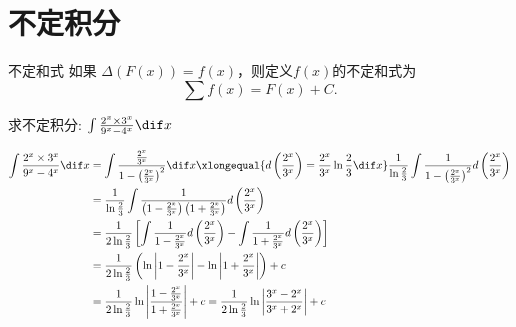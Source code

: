 \documentclass[color=green,titlestyle=hang]{elegantbook}%
\begin{document}
\section{不定积分}

\begin{definition}{不定和式}{}
如果 $\Delta(F(x))=f(x)$，则定义$f(x)$的{\color{blue}不定和式}为
\[ \sum f(x) = F(x) + C. \]
\end{definition}

\begin{exercise}
求不定积分: $\int {\frac{{{2^x} \times {3^x}}}{{{9^x} - {4^x}}}} \dif x$	
\end{exercise}\begin{solution}
\begin{align*}
\int {\frac{{{2^x} \times {3^x}}}{{{9^x} - {4^x}}}} \dif x&= \int {\frac{{\frac{{{2^x}}}{{{3^x}}}}}{{1 - {{\left( {\frac{{{2^x}}}{{{3^x}}}} \right)}^2}}}} \dif x\xlongequal{{d\left( {\frac{{{2^x}}}{{{3^x}}}} \right) = \frac{{{2^x}}}{{{3^x}}}\ln \frac{2}{3}\dif x}}
\frac{1}{{\ln \frac{2}{3}}}\int {\frac{1}{{1 - {{\left( {\frac{{{2^x}}}{{{3^x}}}} \right)}^2}}}} d\left( {\frac{{{2^x}}}{{{3^x}}}} \right)\\
&= \frac{1}{{\ln \frac{2}{3}}}\int {\frac{1}{{\left( {1 - \frac{{{2^x}}}{{{3^x}}}} \right)\left( {1 + \frac{{{2^x}}}{{{3^x}}}} \right)}}} d\left( {\frac{{{2^x}}}{{{3^x}}}} \right)\\
&= \frac{1}{{2\ln \frac{2}{3}}}\left[ {\int {\frac{1}{{1 - \frac{{{2^x}}}{{{3^x}}}}}} d\left( {\frac{{{2^x}}}{{{3^x}}}} \right) - \int {\frac{1}{{1 + \frac{{{2^x}}}{{{3^x}}}}}} d\left( {\frac{{{2^x}}}{{{3^x}}}} \right)} \right]\\
&= \frac{1}{{2\ln \frac{2}{3}}}\left( {\ln \left| {1 - \frac{{{2^x}}}{{{3^x}}}} \right| - \ln \left| {1 + \frac{{{2^x}}}{{{3^x}}}} \right|} \right) + c \\
&= \frac{1}{{2\ln \frac{2}{3}}}\ln \left| {\frac{{1 - \frac{{{2^x}}}{{{3^x}}}}}{{1 + \frac{{{2^x}}}{{{3^x}}}}}} \right| + c = \frac{1}{{2\ln \frac{2}{3}}}\ln \left| {\frac{{{3^x} - {2^x}}}{{{3^x} + {2^x}}}} \right| + c
\end{align*}	
\end{solution}
\end{document}
